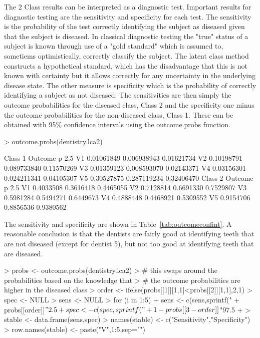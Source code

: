 The 2 Class results can be interpreted as a diagnostic test. Important results for diagnostic testing are the sensitivity and specificity for each test. The sensitivity is the probability of the test correctly identifying the subject as diseased given that the subject is diseased. In classical diagnostic testing the "true" status of a subject is known through use of a "gold standard" which is assumed to, sometiems optimistically, correctly classify the subject. The latent class method constructs a hypothetical standard, which has the disadvantage that this is not known with certainty but it allows correctly for any uncertainty in the underlying disease state. The other measure is specificity which is the probability of correctly identifying a subject as not diseased.
The sensitivities are then simply the outcome probabilities for the diseased class, Class 2 and the specificity one minus the outcome probabilities for the non-diseased class, Class 1. These can be obtained with 95\% confidence intervals using the outcome.probs function.

\begin{Schunk}
\begin{Sinput}
> outcome.probs(dentistry.lca2)
\end{Sinput}
\begin{Soutput}
Class  1 
    Outcome p       2.5 %
V1 0.01061849 0.006938943 0.01621734
V2 0.10198791 0.089733840 0.11570269
V3 0.01359123 0.008593070 0.02143371
V4 0.03156301 0.024211341 0.04105307
V5 0.30527875 0.287119234 0.32406470
Class  2 
   Outcome p     2.5 %
V1 0.4033508 0.3616418 0.4465055
V2 0.7128814 0.6691330 0.7529807
V3 0.5981284 0.5494271 0.6449673
V4 0.4888448 0.4468921 0.5309552
V5 0.9154706 0.8856536 0.9380562
\end{Soutput}
\end{Schunk}

The sensitivity and specificity are shown in Table~\ref{tab:outcomeconfint}. A reasonable conclusion is that the dentists are fairly good at identifying teeth that are not diseased (except for dentist 5), but not too good at identifying teeth that are diseased.

\begin{Schunk}
\begin{Sinput}
> probs <- outcome.probs(dentistry.lca2)
> # this swaps around the probabilities based on the knowledge that
> # the outcome probabilities are higher in the diseased class
> order <- ifelse(probs[[1]][1,1]<probs[[2]][1,1],2,1)
> spec <- NULL
> sens <- NULL
> for (i in 1:5) {
+     sens <- c(sens,sprintf("%
+         probs[[order]]$"2.5 %
+     spec <- c(spec,sprintf("%
+         1-probs[[3-order]]$"97.5 %
+ }
> stable <- data.frame(sens,spec)
> names(stable) <- c("Sensitivity","Specificity")
> row.names(stable) <- paste("V",1:5,sep="")
\end{Sinput}
\end{Schunk}


